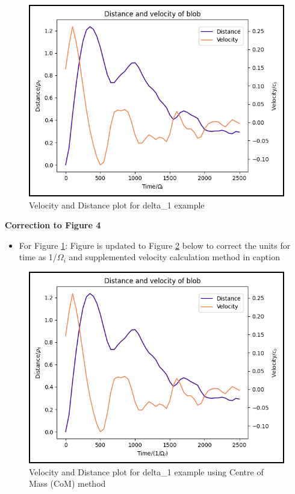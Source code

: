 \documentclass{article}
\begin{document}
\begin{arrowlist}
    \begin{figure}[H]
    \centering
        \includegraphics[height=0.5\textheight]{./Fig/Fig3 vel plot_v2.png}
        \normalsize{\caption{Velocity and Distance plot for delta\_1 example}
        \label{fig:fig4}}
    \end{figure}   

\item \textbf{Correction to Figure 4}
    \begin{itemize}
        \item For Figure \ref{fig:fig4}: Figure is updated to Figure \ref{fig:fig5} below to correct the units for time as 1/$\Omega_i$ and supplemented velocity calculation method in caption
    \end{itemize}

    \begin{figure}[H]
    \centering
        \includegraphics[height=0.5\textheight]{./Fig/Fig3 vel plot_v3.png}
        \normalsize{\caption{Velocity and Distance plot for delta\_1 example using Centre of Mass (CoM) method}
        \label{fig:fig5}}
    \end{figure}   


\end{arrowlist}
\end{document}
